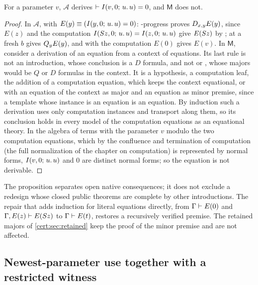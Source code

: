 \begin{proposition}\label{cert:prop:membership-major}
For a parameter $v$, $\mathcal A$ derives $\vdash I(v,0;\,u.\,u)=0$, and
$\mathsf M$ does not.
\end{proposition}
\begin{proof}
In $\mathcal A$, with $E(y)\equiv(I(y,0;\,u.\,u)=0)$: -progress
proves $D_{x,y}E(y)$, since $E(z)$ and the computation $I(S z,0;\,u.\,u)
=I(z,0;\,u.\,u)$ give $E(S z)$ by ;  at a fresh
$b$ gives $Q_{y}E(y)$, and  with the computation $E(0)$ gives
$E(v)$. In $\mathsf M$, consider a derivation of an equation from a context of
equations. Its last rule is not an introduction, whose conclusion is a $D$
formula, and not  or , whose majors would be $Q$ or
$D$ formulas in the context. It is a hypothesis, a computation leaf, the
addition of a computation equation, which keeps the context equational, or
 with an equation of the context as major and an equation as
minor premise, since a template whose instance is an equation is an equation.
By induction such a derivation uses only computation instances and transport
along them, so its conclusion holds in every model of the computation
equations as an equational theory. In the algebra of terms with the parameter
$v$ modulo the two computation equations, which by the confluence and
termination of computation (the full normalization of the chapter on
computation) is represented by normal forms, $I(v,0;\,u.\,u)$ and $0$ are
distinct normal forms; so the equation is not derivable.
\end{proof}

The proposition separates open native consequences; it does not exclude a
redesign whose closed public theorems are complete by other introductions. The
repair that adds induction for literal equations directly, from
$\Gamma\vdash E(0)$ and $\Gamma,E(z)\vdash E(S z)$ to $\Gamma\vdash E(t)$,
restores a recursively verified premise. The retained majors of
\cref{cert:sec:retained} keep the proof of the minor premise and are not
affected.

\subsection{Newest-parameter use together with a restricted witness}\label{cert:sec:joint-restriction}

